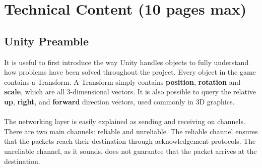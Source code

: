 \documentclass[11pt,a4paper]{article}
\begin{document}
\pagebreak


 \section{Technical Content (10 pages max)}

 \subsection{Unity Preamble}
 It is useful to first introduce the way Unity handles objects to fully understand how problems have been solved throughout the project. 
 Every object in the game contains a Transform. A Transform simply contains \textbf{position}, \textbf{rotation} and \textbf{scale}, which are all 3-dimensional vectors. It is also possible to query the relative \textbf{up}, \textbf{right}, and \textbf{forward} direction vectors, used commonly in 3D graphics. \\ \\
\noindent
 The networking layer is easily explained as sending and receiving on channels. There are two main channels: reliable and unreliable. The reliable channel ensures that the packets reach their destination through acknowledgement protocols. The unreliable channel, as it sounds, does not guarantee that the packet arrives at the destination.
 
\end{document}
